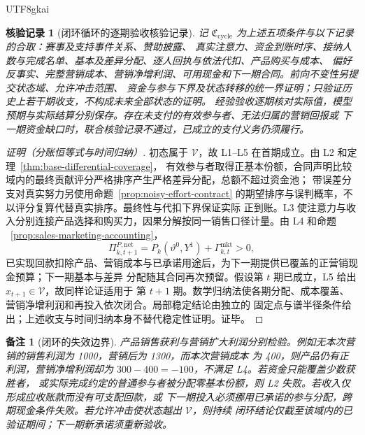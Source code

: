 \documentclass[12pt,a4paper,openany]{report}
\newtheorem{remark}{备注}[chapter]
\newtheorem{Certificate}{核验记录}[chapter]
\begin{document}
\begin{CJK*}{UTF8}{gkai}
\begin{Certificate}[闭环循环的逐期验收核验记录]
\label{cert:competition-closed-cycle}
记 \(\mathfrak C_{\mathrm{cycle}}\) 为上述五项条件与以下记录的合取：赛事及支持事件关系、赞助披露、
真实注意力、资金到账时序、接纳人数与完成名单、基本及差异分配、逐人回执与依法代扣、产品购买与成本、
偏好反事实、完整营销成本、营销净增利润、可用现金和下一期合同。前向不变性另提交状态域、允许冲击范围、
资金与参与下界及状态转移的统一界证明；只验证历史上若干期收支，不构成未来全部状态的证明。
经验验收逐期核对实际值，模型预期与实际结算分别保存。存在未支付的有效参与者、无法归属的营销回报或
下一期资金缺口时，联合核验记录不通过，已成立的支付义务仍须履行。
\end{Certificate}

\begin{proof}[证明（分账恒等式与时间归纳）]
初态属于 \(\mathcal V\)，故 L1--L5 在首期成立。由 L2 和定理~\ref{thm:base-differential-coverage}，
有效参与者取得正基本份额，合同声明比较域内的最终贡献评分严格排序产生严格差异分配，总额不超过资金池；
带误差分支对真实努力另使用命题~\ref{prop:noisy-effort-contract} 的期望排序与误判概率，不以评分复算代替真实排序。最终性与代扣下界保证实际
正到账。L3 使注意力与收入分别连接产品选择和购买力，因果分解按同一销售口径计量。由 L4 和命题
~\ref{prop:sales-marketing-accounting}，
\[
  \Pi_{k,t+1}^{P,\mathrm{net}}
    =P_k(\vartheta^0,Y^1)+\Gamma_{k,t}^{\mathrm{mkt}}>0,
\]
已实现回款扣除产品、营销成本与已承诺用途后，为下一期提供已覆盖的正营销现金预算；下一期基本与差异
分配随其合同再次预留。假设第 \(t\) 期已成立，L5 给出 \(x_{t+1}\in\mathcal V\)，故同样论证适用于
第 \(t+1\) 期。数学归纳法使各期分配、成本覆盖、营销净增利润和再投入依次闭合。局部稳定结论由独立的
固定点与谱半径条件给出；上述收支与时间归纳本身不替代稳定性证明。证毕。
\end{proof}

\begin{remark}[闭环的失效边界]
产品销售获利与营销扩大利润分别检验。例如无本次营销的销售利润为 1000，营销后为 1300，而本次营销成本
为 400，则产品仍有正利润，营销净增利润却为 \(300-400=-100\)，不满足 L4。若资金只能覆盖少数获胜者，
或实际完成约定的普通参与者被分配零基本份额，则 L2 失败。若收入仅形成应收账款而没有可支配回款，或
下一期投入必须挪用已承诺的参与分配，跨期现金条件失败。若允许冲击使状态越出 \(\mathcal V\)，则持续
闭环结论仅截至该域内的已验证期间；下一期新承诺须重新验收。
\end{remark}


\end{CJK*}
\end{document}
